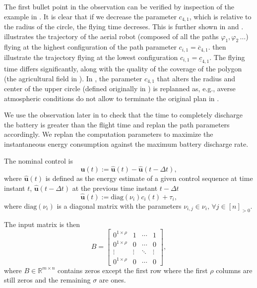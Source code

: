 The first bullet point in the observation can be verified by inspection of the example in . It is clear that if we decrease the parameter $c_{4,1}$, which is relative to the radius of the circle, the flying time decreses. This is further shown in  and .  illustrates the trajectory of the aerial robot (composed of all the paths $\varphi_1,\varphi_2\,\dots$) flying at the highest configuration of the path parameter $c_{i,1}=\overline{c}_{4,1}$.  then illustrate the trajectory flying at the lowest configuration $c_{i,1}=\underline{c}_{4,1}$. The flying time differs significantly, along with the quality of the coverage of the polygon (the agricultural field in ). In , the parameter $c_{4,1}$ that alters the radius and center of the upper circle (defined originally in ) is replanned as, e.g., averse atmospheric conditions do not allow to terminate the original plan in .

We use the observation later in  to check that the time to completely discharge the battery is greater than the flight time and replan the path parameters accordingly.  We replan the computation parameters to maximize the instantaneous energy consumption against the maximum battery discharge rate.

The nominal control is
\begin{equation}\label{eq:state-control}
  \mathbf{u}(t):=\hat{\mathbf{u}}(t)-\hat{\mathbf{u}}(t-\Delta t),
\end{equation}
where $\hat{\mathbf{u}}(t)$ is defined as the energy estimate of a given control sequence at time instant $t$, $\hat{\mathbf{u}}(t-\Delta t)$ at the previous time instant $t-\Delta t$
\begin{equation}\label{eq:estimate-control}
  \hat{\mathbf{u}}(t):=\mathrm{diag}(\nu_i)c_i(t)+\tau_i,
\end{equation}
where $\mathrm{diag}(\nu_i)$ is a diagonal matrix with the parameters
$\nu_{i,j}\in\nu_i,\,\forall j\in[n]_{>0}$.

The input matrix is then
\begin{equation}\label{eq:mat_B}
  B=\begin{bmatrix} 
    0^{1\times\rho} & 1      & \cdots & 1      \\
    0^{1\times\rho} & 0      & \cdots & 0      \\ 
    \vdots          & \vdots & \ddots & \vdots \\
    0^{1\times\rho} & 0      & \cdots & 0      \end{bmatrix},
\end{equation}
where $B\in\mathbb{R}^{m\times n}$ contains zeros except the first row where the first $\rho$ columns are still zeros and the remaining $\sigma$ are ones. 

